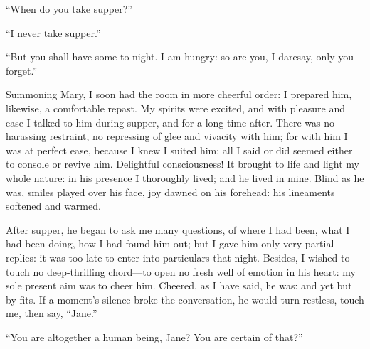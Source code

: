 \enquote{When do you take supper?}

\enquote{I never take supper.}

\enquote{But you shall have some to-night. I am hungry: so are you, I
	daresay, only you forget.}

Summoning Mary, I soon had the room in more cheerful order: I prepared
him, likewise, a comfortable repast. My spirits were excited, and with
pleasure and ease I talked to him during supper, and for a long time
after. There was no harassing restraint, no repressing of glee and
vivacity with him; for with him I was at perfect ease, because I knew I
suited him; all I said or did seemed either to console or revive him.
Delightful consciousness! It brought to life and light my whole nature:
in his presence I thoroughly lived; and he lived in mine. Blind as he
was, smiles played over his face, joy dawned on his forehead: his
lineaments softened and warmed.

After supper, he began to ask me many questions, of where I had been,
what I had been doing, how I had found him out; but I gave him only very
partial replies: it was too late to enter into particulars that night.
Besides, I wished to touch no deep-thrilling chord---to open no fresh
well of emotion in his heart: my sole present aim was to cheer him.
Cheered, as I have said, he was: and yet but by fits. If a moment's
silence broke the conversation, he would turn restless, touch me, then
say, \enquote{Jane.}

\enquote{You are altogether a human being, Jane? You are certain of
	that?}

